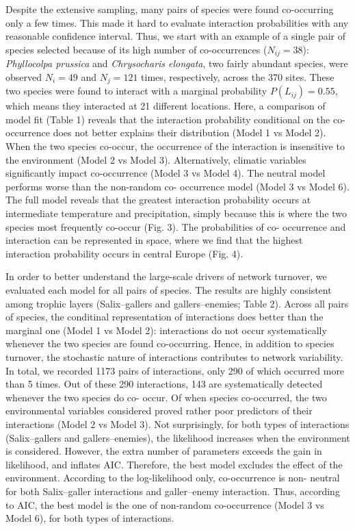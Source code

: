 \documentclass[12pt]{article}
\begin{document}
Despite the extensive sampling, many pairs of species were found co-occurring
only a few times. This made it hard to evaluate interaction probabilities with
any reasonable confidence interval. Thus, we start with an example of a single
pair of species selected because of its high number of co-occurrences
($N_{ij}=38$): \textit{Phyllocolpa prussica} and \textit{Chrysocharis
elongata}, two fairly abundant species, were observed $N_i=49$ and $N_j=121$
times, respectively, across the 370 sites. These two species were found to
interact with a marginal probability $P(L_{ij})=0.55$, which means they
interacted at 21 different locations. Here, a comparison of model fit (Table
1) reveals that the interaction probability conditional on the co-occurrence
does not better explains their distribution (Model 1 vs Model 2). When the two
species co-occur, the occurrence of the interaction is insensitive to the
environment (Model 2 vs Model 3). Alternatively, climatic variables
significantly impact co-occurrence (Model 3 vs Model 4). The neutral model
performs worse than the non-random co- occurrence model (Model 3 vs Model 6).
The full model reveals that the greatest interaction probability occurs at
intermediate temperature and precipitation, simply because this is where the
two species most frequently co-occur (Fig. 3). The probabilities of co-
occurrence and interaction can be represented in space, where we find that the
highest interaction probability occurs in central Europe (Fig. 4).

In order to better understand the large-scale drivers of network turnover, we
evaluated each model for all pairs of species. The results are highly
consistent among trophic layers (Salix–gallers and gallers–enemies; Table 2).
Across all pairs of species, the conditinal representation of interactions
does better than the marginal one (Model 1 vs Model 2): interactions do not
occur systematically whenever the two species are found co-occurring. Hence,
in addition to species turnover, the stochastic nature of interactions
contributes to network variability. In total, we recorded 1173 pairs of
interactions, only 290 of which occurred more than 5 times. Out of these 290
interactions, 143 are systematically detected whenever the two species do co-
occur. Of when species co-occurred, the two environmental variables considered
proved rather poor predictors of their interactions (Model 2 vs Model 3). Not
surprisingly, for both types of interactions (Salix–gallers and
gallers–enemies), the likelihood increases when the environment is considered.
However, the extra number of parameters exceeds the gain in likelihood, and
inflates AIC. Therefore, the best model excludes the effect of the
environment. According to the log-likelihood only, co-occurrence is non-
neutral for both Salix–galler interactions and galler–enemy interaction. Thus,
according to AIC, the best model is the one of non-random co-occurrence (Model
3 vs Model 6), for both types of interactions.
\end{document}
